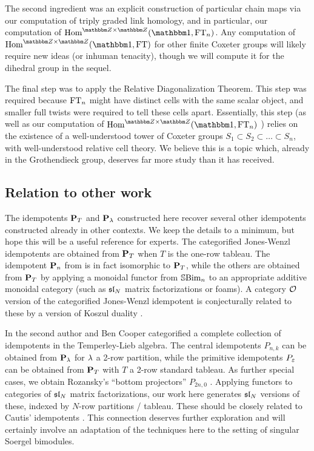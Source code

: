 The second ingredient was an explicit construction of particular chain maps via our computation of triply graded link homology, and in particular, our computation of $\Hom^{\Z\times \Z}(\one,\FT_n)$.  Any computation of $\Hom^{\Z\times \Z}(\one,\FT)$ for other finite Coxeter groups will likely require new ideas (or inhuman tenacity), though we will compute it for the dihedral group in the sequel.

The final step was to apply the Relative Diagonalization Theorem. This step was required because $\FT_n$ might have distinct cells with the same scalar object, and smaller full twists were required to tell these cells apart. Essentially, this step (as well as our computation of $\Hom^{\Z\times \Z}(\one,\FT_n)$ ) relies on the existence of a well-understood tower of Coxeter groups $S_1 \subset S_2 \subset \ldots \subset S_n$, with well-understood relative cell theory. We believe this is a topic which, already in the Grothendieck group, deserves far more study than it has received.


\subsection{Relation to other work}
\label{subsec:otherwork}


The idempotents $\PB_T$ and $\PB_\l$ constructed here recover several other idempotents constructed already in other contexts.  We keep the details to a minimum, but hope this will be a useful reference for experts. The categorified Jones-Wenzl idempotents \cite{CK12a,Roz10a,Rose14,Hog15} are obtained from $\PB_T$ when $T$ is the one-row tableau.  The idempotent $\PB_n$ from \cite{Hog15} is in fact isomorphic to $\PB_T$, while the others are obtained from $\PB_T$ by applying a monoidal functor from $\SBim_n$ to an appropriate additive monoidal category (such as $\sl_N$ matrix factorizations or foams).  A category $\OC$ version of the categorified Jones-Wenzl idempotent \cite{FSS12} is conjecturally related to these by a version of Koszul duality \cite{SS12}. 

In \cite{CH12} the second author and Ben Cooper categorified a complete collection of idempotents in the Temperley-Lieb algebra.  The central idempotents $P_{n,k}$ can be obtained from $\PB_{\l}$ for $\l$ a 2-row partition, while the primitive idempotents $P_\e$ can be obtained from $\PB_T$ with $T$ a 2-row standard tableau.  As further special cases, we obtain Rozansky's ``bottom projectors'' $P_{2n,0}$ \cite{Roz10b}.  Applying functors to categories of $\sl_N$ matrix factorizations, our work here generates $\sl_N$ versions of these, indexed by $N$-row partitions / tableau.  These should be closely related to Cautis' idempotents \cite{CautisClasp}.  This connection deserves further exploration and will certainly involve an adaptation of the techniques here to the setting of singular Soergel bimodules.

